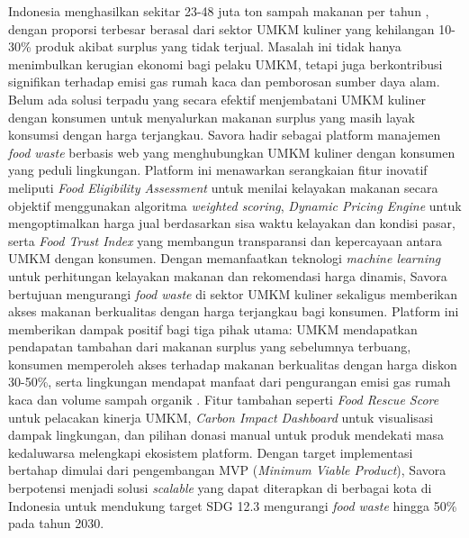 Indonesia menghasilkan sekitar 23-48 juta ton sampah makanan per tahun \cite{bps2024lingkungan}\cite{indonesiapolicy2025}, dengan proporsi terbesar berasal dari sektor UMKM kuliner yang kehilangan 10-30\% produk akibat surplus yang tidak terjual. Masalah ini tidak hanya menimbulkan kerugian ekonomi bagi pelaku UMKM, tetapi juga berkontribusi signifikan terhadap emisi gas rumah kaca dan pemborosan sumber daya alam. Belum ada solusi terpadu yang secara efektif menjembatani UMKM kuliner dengan konsumen untuk menyalurkan makanan surplus yang masih layak konsumsi dengan harga terjangkau. Savora hadir sebagai platform manajemen \textit{food waste} berbasis web yang menghubungkan UMKM kuliner dengan konsumen yang peduli lingkungan. Platform ini menawarkan serangkaian fitur inovatif meliputi \textit{Food Eligibility Assessment} untuk menilai kelayakan makanan secara objektif menggunakan algoritma \textit{weighted scoring}, \textit{Dynamic Pricing Engine} \cite{qlearning2026pricing} untuk mengoptimalkan harga jual berdasarkan sisa waktu kelayakan dan kondisi pasar, serta \textit{Food Trust Index} yang membangun transparansi dan kepercayaan antara UMKM dengan konsumen. Dengan memanfaatkan teknologi \textit{machine learning} \cite{kusumawati2025mobile} untuk perhitungan kelayakan makanan dan rekomendasi harga dinamis, Savora bertujuan mengurangi \textit{food waste} di sektor UMKM kuliner sekaligus memberikan akses makanan berkualitas dengan harga terjangkau bagi konsumen. Platform ini memberikan dampak positif bagi tiga pihak utama: UMKM mendapatkan pendapatan tambahan dari makanan surplus yang sebelumnya terbuang, konsumen memperoleh akses terhadap makanan berkualitas dengan harga diskon 30-50\%, serta lingkungan mendapat manfaat dari pengurangan emisi gas rumah kaca dan volume sampah organik \cite{fao2024state}. Fitur tambahan seperti \textit{Food Rescue Score} untuk pelacakan kinerja UMKM, \textit{Carbon Impact Dashboard} untuk visualisasi dampak lingkungan, dan pilihan donasi manual untuk produk mendekati masa kedaluwarsa melengkapi ekosistem platform. Dengan target implementasi bertahap dimulai dari pengembangan MVP (\textit{Minimum Viable Product}), Savora berpotensi menjadi solusi \textit{scalable} yang dapat diterapkan di berbagai kota di Indonesia untuk mendukung target SDG 12.3 \cite{unsdg2024} mengurangi \textit{food waste} hingga 50\% pada tahun 2030.
